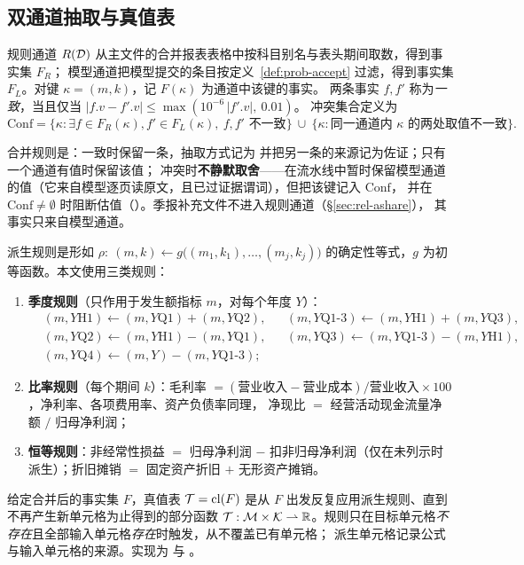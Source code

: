 \subsection{双通道抽取与真值表}
\label{sec:prob-truth}

\begin{definition}[两个通道与一致性]
\label{def:prob-channels}
规则通道 $R(\mathcal{D})$ 从主文件的合并报表表格中按科目别名与表头期间取数，得到事实集 $F_R$；
模型通道把模型提交的条目按定义~\ref{def:prob-accept} 过滤，得到事实集 $F_L$。对键 $\kappa=(m,k)$，记 $F(\kappa)$ 为通道中该键的事实。
两条事实 $f,f'$ 称为\emph{一致}，当且仅当 $|f.v-f'.v|\le\max(10^{-6}\,|f'.v|,\ 0.01)$。
冲突集合定义为
\[
\mathrm{Conf}=\{\kappa : \exists f\in F_R(\kappa), f'\in F_L(\kappa),\ f,f' \text{ 不一致}\}\ \cup\ \{\kappa : \text{同一通道内 } \kappa \text{ 的两处取值不一致}\}.
\]
\end{definition}

合并规则是：一致时保留一条，抽取方式记为  并把另一条的来源记为佐证；只有一个通道有值时保留该值；
冲突时\textbf{不静默取舍}——在流水线中暂时保留模型通道的值（它来自模型逐页读原文，且已过证据谓词），但把该键记入 $\mathrm{Conf}$，
并在 $\mathrm{Conf}\neq\emptyset$ 时阻断估值（）。季报补充文件不进入规则通道（\S\ref{sec:rel-ashare}），
其事实只来自模型通道。

\begin{definition}[派生规则与真值表]
\label{def:prob-truth}
派生规则是形如 $\rho:\ (m,k)\leftarrow g\big((m_1,k_1),\dots,(m_j,k_j)\big)$ 的确定性等式，$g$ 为初等函数。本文使用三类规则：
\begin{enumerate}
\item \textbf{季度规则}（只作用于发生额指标 $m$，对每个年度 $Y$）：
  \[
  \begin{aligned}
  &(m,Y\text{H1})\leftarrow (m,Y\text{Q1})+(m,Y\text{Q2}), && (m,Y\text{Q1-3})\leftarrow (m,Y\text{H1})+(m,Y\text{Q3}),\\
  &(m,Y\text{Q2})\leftarrow (m,Y\text{H1})-(m,Y\text{Q1}), && (m,Y\text{Q3})\leftarrow (m,Y\text{Q1-3})-(m,Y\text{H1}),\\
  &(m,Y\text{Q4})\leftarrow (m,Y)-(m,Y\text{Q1-3});
  \end{aligned}
  \]
\item \textbf{比率规则}（每个期间 $k$）：毛利率 $=(\text{营业收入}-\text{营业成本})/\text{营业收入}\times100$，净利率、各项费用率、资产负债率同理，
      净现比 $=$ 经营活动现金流量净额 $/$ 归母净利润；
\item \textbf{恒等规则}：非经常性损益 $=$ 归母净利润 $-$ 扣非归母净利润（仅在未列示时派生）；折旧摊销 $=$ 固定资产折旧 $+$ 无形资产摊销。
\end{enumerate}
给定合并后的事实集 $F$，真值表 $\mathcal{T}=\operatorname{cl}(F)$ 是从 $F$ 出发反复应用派生规则、直到不再产生新单元格为止得到的部分函数
$\mathcal{T}:\mathcal{M}\times\mathcal{K}\rightharpoonup\mathbb{R}$。规则只在目标单元格\emph{不存在}且全部输入单元格\emph{存在}时触发，从不覆盖已有单元格；
派生单元格记录公式与输入单元格的来源。实现为  与 。
\end{definition}

